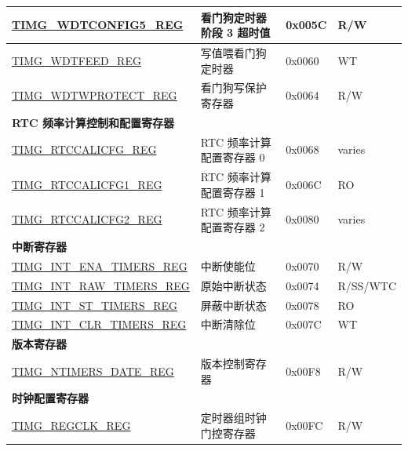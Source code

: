 \begin{longtable}{ | p{6cm} | p{7.0cm} | p{1.3cm} | p{1.7cm} | }
\hyperref[regdesc:TIMGWDTCONFIG5REG]{TIMG\_WDTCONFIG5\_REG} & 看门狗定时器阶段 3 超时值 & 0x005C & R/W \\ \hline
\hyperref[regdesc:TIMGWDTFEEDREG]{TIMG\_WDTFEED\_REG} & 写值喂看门狗定时器 & 0x0060 & WT \\ \hline
\hyperref[regdesc:TIMGWDTWPROTECTREG]{TIMG\_WDTWPROTECT\_REG} & 看门狗写保护寄存器 & 0x0064 & R/W \\ \hline
\multicolumn{4}{|l|}{\textbf{RTC 频率计算控制和配置寄存器}} \\ \hline
\hyperref[regdesc:TIMGRTCCALICFGREG]{TIMG\_RTCCALICFG\_REG} & RTC 频率计算配置寄存器 0 & 0x0068 & varies \\ \hline
\hyperref[regdesc:TIMGRTCCALICFG1REG]{TIMG\_RTCCALICFG1\_REG} & RTC 频率计算配置寄存器 1 & 0x006C & RO \\ \hline
\hyperref[regdesc:TIMGRTCCALICFG2REG]{TIMG\_RTCCALICFG2\_REG} & RTC 频率计算配置寄存器 2 & 0x0080 & varies \\ \hline
\multicolumn{4}{|l|}{\textbf{中断寄存器}} \\ \hline
\hyperref[regdesc:TIMGINTENATIMERSREG]{TIMG\_INT\_ENA\_TIMERS\_REG} & 中断使能位 & 0x0070 & R/W \\ \hline
\hyperref[regdesc:TIMGINTRAWTIMERSREG]{TIMG\_INT\_RAW\_TIMERS\_REG} & 原始中断状态 & 0x0074 & R/SS/WTC \\ \hline
\hyperref[regdesc:TIMGINTSTTIMERSREG]{TIMG\_INT\_ST\_TIMERS\_REG} & 屏蔽中断状态 & 0x0078 & RO \\ \hline
\hyperref[regdesc:TIMGINTCLRTIMERSREG]{TIMG\_INT\_CLR\_TIMERS\_REG} & 中断清除位 & 0x007C & WT \\ \hline
\multicolumn{4}{|l|}{\textbf{版本寄存器}} \\ \hline
\hyperref[regdesc:TIMGNTIMERSDATEREG]{TIMG\_NTIMERS\_DATE\_REG} & 版本控制寄存器 & 0x00F8 & R/W \\ \hline
\multicolumn{4}{|l|}{\textbf{时钟配置寄存器}} \\ \hline
\hyperref[regdesc:TIMGREGCLKREG]{TIMG\_REGCLK\_REG} & 定时器组时钟门控寄存器 & 0x00FC & R/W \\ \hline
\end{longtable}
